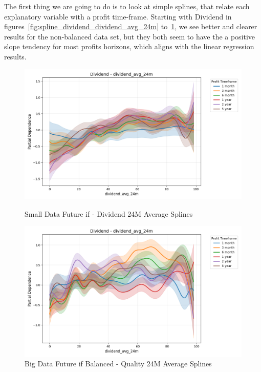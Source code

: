 \documentclass[11pt,english,a4paper,hidelinks]{book}
\begin{document}
\noindent The first thing we are going to do is to look at simple splines, that relate each explanatory variable with a profit time-frame. Starting with Dividend in figures~\ref{fig:spline_dividend_dividend_avg_24m} to~\ref{fig:spline_dividend_dividend_avg_24m_balanced}, we see better and clearer results for the non-balanced data set, but they both seem to have the a positive slope tendency for most profits horizons, which aligns with the linear regression results. 

\begin{figure}[H]
    \centering
    \begin{minipage}{0.48\textwidth}
        \centering
        \includegraphics[width=\textwidth]{images/code/models/general_regression/splines/2D/Small Data future - IF/dividend_dividend_avg_24m.png}
        \caption{Small Data Future \acrshort{if} - Dividend 24M Average Splines}
        \label{fig:spline_dividend_dividend_avg_24m}
    \end{minipage}\hfill
    \begin{minipage}{0.48\textwidth}
        \centering
        \includegraphics[width=\textwidth]{images/code/models/general_regression/splines/2D/Big Data future - IF HARD Balanced/dividend_dividend_avg_24m.png}
        \caption{Big Data Future \acrshort{if} Balanced - Quality 24M Average Splines}
        \label{fig:spline_dividend_dividend_avg_24m_balanced}
    \end{minipage}
\end{figure}
\end{document}
